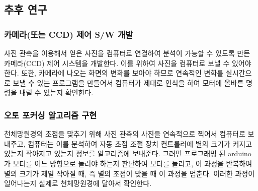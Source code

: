 \documentclass{abstract_hutech}
\begin{document}
\subsection{추후 연구}

\subsubsection{카메라(또는 CCD) 제어 S/W 개발}

사진 관측을 이용해서 얻은 사진을 컴퓨터로 연결하여 분석이 가능할 수 있도록 만든 카메라(CCD) 제어 시스템을 개발한다. 이를 위하여 사진을 컴퓨터로 보낼 수 있어야 한다. 또한, 카메라에 나오는 화면의 변화를 보아야 하므로 연속적인 변화를 실시간으로 보낼 수 있는 프로그램을 만들어서 컴퓨터가 제대로 인식을 하여 모터에 올바른 명령을 내릴 수 있는지 확인한다.

\subsubsection{오토 포커싱 알고리즘 구현}

천체망원경의 초점을 맞추기 위해 사진 관측의 사진을 연속적으로 찍어서 컴퓨터로 보내주고, 컴퓨터는 이를 분석하여 자동 초점 조절 장치 컨트롤러에 별의 크기가 커지고 있는지 작아지고 있는지 정보를 알고리즘에 보내준다. 그러면 프로그래밍 된 arduino가 모터를 어느 방향으로 돌려야 하는지 판단하여 모터를 돌리고, 이 과정을 반복하여 별의 크기가 제일 작아질 때, 즉 별의 초점이 맞을 때 이 과정을 멈춘다. 이러한 과정이 일어나는지 실제로 천체망원경에 달아서 확인한다.


\end{document}
